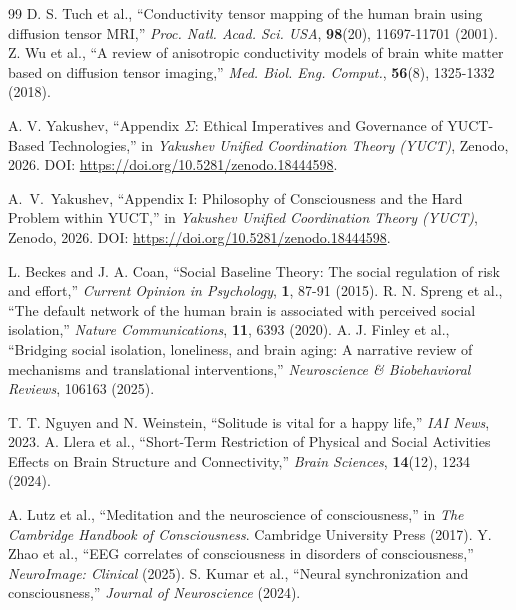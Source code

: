 \documentclass[12pt,a4paper]{article}
\begin{document}
\begin{thebibliography}{99}
		 D. S. Tuch et al., ``Conductivity tensor mapping of the human brain using diffusion tensor MRI,'' \emph{Proc. Natl. Acad. Sci. USA}, \textbf{98}(20), 11697-11701 (2001).
		 Z. Wu et al., ``A review of anisotropic conductivity models of brain white matter based on diffusion tensor imaging,'' \emph{Med. Biol. Eng. Comput.}, \textbf{56}(8), 1325-1332 (2018).
		
		 A. V. Yakushev, ``Appendix \(\Sigma\): Ethical Imperatives and Governance of YUCT-Based Technologies,'' in \emph{Yakushev Unified Coordination Theory (YUCT)}, Zenodo, 2026. DOI: \url{https://doi.org/10.5281/zenodo.18444598}.
		
		 A.~V.~Yakushev, ``Appendix I: Philosophy of Consciousness and the Hard Problem within YUCT,'' in \emph{Yakushev Unified Coordination Theory (YUCT)}, Zenodo, 2026. DOI: \url{https://doi.org/10.5281/zenodo.18444598}.
		
		 L. Beckes and J. A. Coan, ``Social Baseline Theory: The social regulation of risk and effort,'' \emph{Current Opinion in Psychology}, \textbf{1}, 87-91 (2015).
		 R. N. Spreng et al., ``The default network of the human brain is associated with perceived social isolation,'' \emph{Nature Communications}, \textbf{11}, 6393 (2020).
		 A. J. Finley et al., ``Bridging social isolation, loneliness, and brain aging: A narrative review of mechanisms and translational interventions,'' \emph{Neuroscience \& Biobehavioral Reviews}, 106163 (2025).
		
		 T. T. Nguyen and N. Weinstein, ``Solitude is vital for a happy life,'' \emph{IAI News}, 2023.
		 A. Llera et al., ``Short-Term Restriction of Physical and Social Activities Effects on Brain Structure and Connectivity,'' \emph{Brain Sciences}, \textbf{14}(12), 1234 (2024).
		
		 A. Lutz et al., ``Meditation and the neuroscience of consciousness,'' in \emph{The Cambridge Handbook of Consciousness}. Cambridge University Press (2017).
		 Y. Zhao et al., ``EEG correlates of consciousness in disorders of consciousness,'' \emph{NeuroImage: Clinical} (2025).
		 S. Kumar et al., ``Neural synchronization and consciousness,'' \emph{Journal of Neuroscience} (2024).
		
	\end{thebibliography}
	
\end{document}
